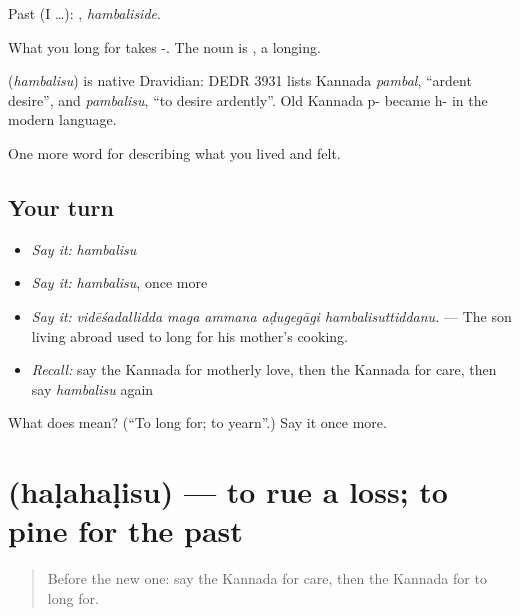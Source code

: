 Past (I …): , \emph{hambaliside}.

What you long for takes -. The noun is , a longing.

\begin{cousinweb}
\textbf{} (\emph{hambalisu}) is native Dravidian: DEDR 3931 lists Kannada \emph{pambal}, \textquotedblleft{}ardent desire\textquotedblright{}, and \emph{pambalisu}, \textquotedblleft{}to desire ardently\textquotedblright{}. Old Kannada p- became h- in the modern language.
\end{cousinweb}

\begin{grammarlens}[title={What you've built}]
One more word for describing what you lived and felt.
\end{grammarlens}

\subsection*{Your turn}
\begin{itemize}
\raggedright
  \item \emph{Say it:} \emph{hambalisu}
  \item \emph{Say it:} \emph{hambalisu}, once more
  \item \emph{Say it:} \emph{vidēśadallidda maga ammana aḍugegāgi hambalisuttiddanu.} — The son living abroad used to long for his mother's cooking.
  \item \emph{Recall:} say the Kannada for motherly love, then the Kannada for care, then say \emph{hambalisu} again
\end{itemize}

\begin{tcolorbox}[breakable,colback=teal!4,colframe=teal!35!black,title={Before you move on}]
What does  mean? (\textquotedblleft{}To long for; to yearn\textquotedblright{}.) Say it once more.
\end{tcolorbox}
\section[\texorpdfstring{\kn{ಹಳಹಳಿಸು} (haḷahaḷisu)}{ಹಳಹಳಿಸು (haḷahaḷisu)}]{ (haḷahaḷisu) — to rue a loss; to pine for the past}

\label{lesson:KA-C496-halahalisu}



\begin{quote}
Before the new one: say the Kannada for care, then the Kannada for to long for.
\end{quote}

